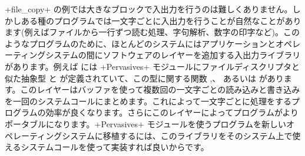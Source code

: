 \ml+file_copy+ の例では大きなブロックで入出力を行うのは難しくありません。しかしある種のプログラムでは一文字ごとに入出力を行うことが自然なことがあります(例えばファイルから一行ずつ読む処理、字句解析、数字の印字など)。このようなプログラムのために、ほとんどのシステムにはアプリケーションとオペレーティングシステムの間にソフトウェアのレイヤーを追加する入出力ライブラリがあります。例えば \ocaml には \ml+Pervasives+ モジュールにファイルディスクリプタと似た抽象型 と  が定義されていて、この型に関する関数 ,、 あるいは  があります。このレイヤーはバッファを使って複数回の一文字ごとの読み込みと書き込みを一回のシステムコールにまとめます。これによって一文字ごとに処理をするプログラムの効率が良くなります。さらにこのレイヤーによってプログラムがよりポータブルになります。\ml+Pervasives+ モジュールを使うプログラムを新しいオペレーティングシステムに移植するには、このライブラリをそのシステム上で使えるシステムコールを使って実装すれば良いからです。


